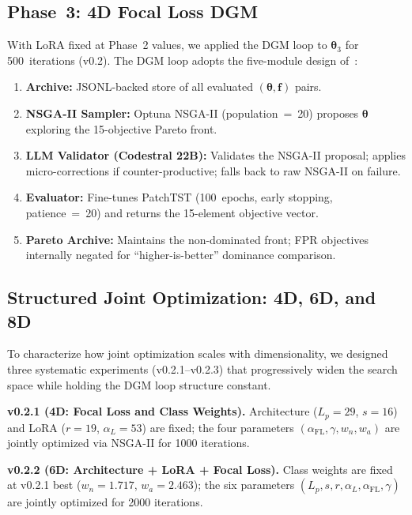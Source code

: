 ﻿\documentclass[twocolumn]{article}
\begin{document}
\subsection{Phase~3: 4D Focal Loss DGM}
\label{subsec:phase3}

With LoRA fixed at Phase~2 values, we applied the DGM loop to
$\boldsymbol{\theta}_3$ for 500~iterations (v0.2).
The DGM loop adopts the five-module design of~\cite{yasuno2026dgm}:

\begin{enumerate}[leftmargin=*,topsep=2pt,itemsep=1pt]
  \item \textbf{Archive:} JSONL-backed store of all evaluated
        $(\boldsymbol{\theta}, \mathbf{f})$ pairs.
  \item \textbf{NSGA-II Sampler:} Optuna NSGA-II (population~=~20)
        proposes $\boldsymbol{\theta}$ exploring the 15-objective
        Pareto front.
  \item \textbf{LLM Validator (Codestral 22B):} Validates the NSGA-II
        proposal; applies micro-corrections if counter-productive;
        falls back to raw NSGA-II on failure.
  \item \textbf{Evaluator:} Fine-tunes PatchTST (100~epochs,
        early stopping, patience~=~20) and returns the 15-element
        objective vector.
  \item \textbf{Pareto Archive:} Maintains the non-dominated front;
        FPR objectives internally negated for ``higher-is-better''
        dominance comparison.
\end{enumerate}

\subsection{Structured Joint Optimization: 4D, 6D, and 8D}
\label{subsec:joint_structured}

To characterize how joint optimization scales with dimensionality,
we designed three systematic experiments (v0.2.1--v0.2.3) that
progressively widen the search space while holding the DGM loop
structure constant.

\textbf{v0.2.1 (4D: Focal Loss and Class Weights).}
Architecture ($L_p{=}29$, $s{=}16$) and LoRA ($r{=}19$, $\alpha_L{=}53$)
are fixed; the four parameters
$(\alpha_{\text{FL}},\gamma,w_n,w_a)$ are jointly optimized
via NSGA-II for 1000 iterations.

\textbf{v0.2.2 (6D: Architecture + LoRA + Focal Loss).}
Class weights are fixed at v0.2.1 best
($w_n{=}1.717$, $w_a{=}2.463$);
the six parameters
$(L_p, s, r, \alpha_L, \alpha_{\text{FL}}, \gamma)$
are jointly optimized for 2000 iterations.
\end{document}
